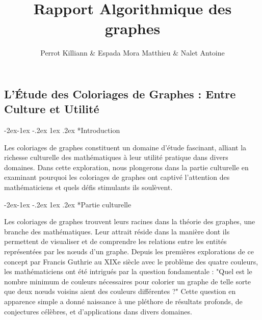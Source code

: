 \documentclass{report}
\title{\Huge Rapport Algorithmique des graphes}
\author{\huge Perrot Killiann \& Espada Mora Matthieu \& Nalet Antoine}
\date{}
\makeatletter
\renewcommand\subsection{\@startsection{subsection}{2}{\z@}%
  {-2ex\@plus -1ex \@minus -.2ex}%
  {1ex \@plus .2ex}%
  {\normalfont\bfseries}}
\makeatother
\begin{document}
\begin{titlepage}
    \centering
    \maketitle
    \newpage
   
    \tableofcontents
    \pagebreak
\end{titlepage}

\chapter{}
\section*{L'Étude des Coloriages de Graphes : Entre Culture et Utilité}

\subsection*{Introduction}

Les coloriages de graphes constituent un domaine d'étude fascinant, alliant la richesse culturelle des mathématiques à leur utilité pratique dans divers domaines. Dans cette exploration, nous plongerons dans la partie culturelle en examinant pourquoi les coloriages de graphes ont captivé l'attention des mathématiciens et quels défis stimulants ils soulèvent.

\subsection*{Partie culturelle}

Les coloriages de graphes trouvent leurs racines dans la théorie des graphes, une branche des mathématiques. Leur attrait réside dans la manière dont ils permettent de visualiser et de comprendre les relations entre les entités représentées par les nœuds d'un graphe. Depuis les premières explorations de ce concept par Francis Guthrie au XIXe siècle avec le problème des quatre couleurs, les mathématiciens ont été intrigués par la question fondamentale : "Quel est le nombre minimum de couleurs nécessaires pour colorier un graphe de telle sorte que deux nœuds voisins aient des couleurs différentes ?" Cette question en apparence simple a donné naissance à une pléthore de résultats profonds, de conjectures célèbres, et d'applications dans divers domaines.
\end{document}
